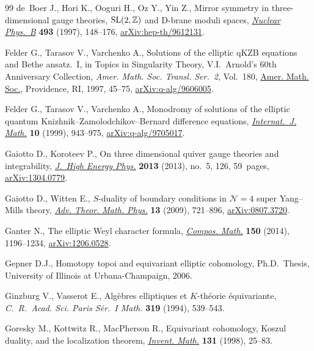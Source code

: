 \documentclass[pdftex]{sigma}
\numberwithin{equation}{section}
\begin{document}
\begin{thebibliography}{99}
de~Boer J., Hori K., Ooguri H., Oz Y., Yin Z., Mirror symmetry in
 three-dimensional gauge theories, {${\rm SL}(2,{\mathbb Z})$} and {D}-brane
 moduli spaces, \href{https://doi.org/10.1016/S0550-3213(97)00115-6}{\textit{Nuclear Phys.~B}} \textbf{493} (1997), 148--176,
 \href{https://arxiv.org/abs/hep-th/9612131}{arXiv:hep-th/9612131}.

Felder G., Tarasov V., Varchenko A., Solutions of the elliptic q{KZB} equations
 and {B}ethe ansatz.~{I}, in Topics in Singularity Theory, V.I.~Arnold's 60th
 Anniversary Collection, \textit{Amer. Math. Soc. Transl. Ser.~2}, Vol.~180,
 \href{https://doi.org/10.1090/trans2/180/04}{Amer. Math. Soc.}, Providence, RI, 1997, 45--75, \href{https://arxiv.org/abs/q-alg/9606005}{arXiv:q-alg/9606005}.

Felder G., Tarasov V., Varchenko A., Monodromy of solutions of the elliptic
 quantum {K}nizhnik--{Z}amolodchikov--{B}ernard difference equations,
 \href{https://doi.org/10.1142/S0129167X99000410}{\textit{Internat.~J. Math.}} \textbf{10} (1999), 943--975,
 \href{https://arxiv.org/abs/q-alg/9705017}{arXiv:q-alg/9705017}.

Gaiotto D., Koroteev P., On three dimensional quiver gauge theories and
 integrability, \href{https://doi.org/10.1007/JHEP05(2013)126}{\textit{J.~High Energy Phys.}} \textbf{2013} (2013), no.~5,
 126, 59~pages, \href{https://arxiv.org/abs/1304.0779}{arXiv:1304.0779}.

Gaiotto D., Witten E., {$S$}-duality of boundary conditions in {${\mathcal
 N}=4$} super {Y}ang--{M}ills theory, \href{https://doi.org/10.4310/ATMP.2009.v13.n3.a5}{\textit{Adv. Theor. Math. Phys.}}
 \textbf{13} (2009), 721--896, \href{https://arxiv.org/abs/0807.3720}{arXiv:0807.3720}.

Ganter N., The elliptic {W}eyl character formula, \href{https://doi.org/10.1112/S0010437X1300777X}{\textit{Compos. Math.}}
 \textbf{150} (2014), 1196--1234, \href{https://arxiv.org/abs/1206.0528}{arXiv:1206.0528}.

Gepner D.J., Homotopy topoi and equivariant elliptic cohomology, Ph.D.~Thesis,
 {U}niversity of Illinois at Urbana-Champaign, 2006.

Ginzburg V., Vasserot E., Alg\`ebres elliptiques et {$K$}-th\'{e}orie
 \'{e}quivariante, \textit{C.~R.~Acad. Sci. Paris S\'{e}r.~I Math.}
 \textbf{319} (1994), 539--543.

Goresky M., Kottwitz R., MacPherson R., Equivariant cohomology, {K}oszul
 duality, and the localization theorem, \href{https://doi.org/10.1007/s002220050197}{\textit{Invent. Math.}} \textbf{131}
 (1998), 25--83.


\end{thebibliography}
\end{document}
